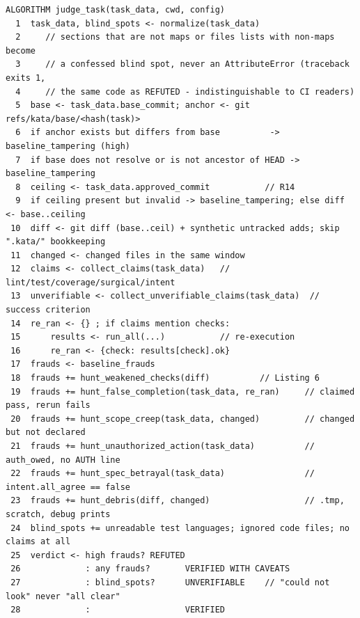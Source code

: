 \documentclass[11pt]{article}
\begin{document}
\begin{lstlisting}[caption=adversarial judge (kata/judge.py).,label=alg:judge]
ALGORITHM judge_task(task_data, cwd, config)
  1  task_data, blind_spots <- normalize(task_data)
  2     // sections that are not maps or files lists with non-maps become
  3     // a confessed blind spot, never an AttributeError (traceback exits 1,
  4     // the same code as REFUTED - indistinguishable to CI readers)
  5  base <- task_data.base_commit; anchor <- git refs/kata/base/<hash(task)>
  6  if anchor exists but differs from base          -> baseline_tampering (high)
  7  if base does not resolve or is not ancestor of HEAD -> baseline_tampering
  8  ceiling <- task_data.approved_commit           // R14
  9  if ceiling present but invalid -> baseline_tampering; else diff <- base..ceiling
 10  diff <- git diff (base..ceil) + synthetic untracked adds; skip ".kata/" bookkeeping
 11  changed <- changed files in the same window
 12  claims <- collect_claims(task_data)   // lint/test/coverage/surgical/intent
 13  unverifiable <- collect_unverifiable_claims(task_data)  // success criterion
 14  re_ran <- {} ; if claims mention checks:
 15      results <- run_all(...)           // re-execution
 16      re_ran <- {check: results[check].ok}
 17  frauds <- baseline_frauds
 18  frauds += hunt_weakened_checks(diff)          // Listing 6
 19  frauds += hunt_false_completion(task_data, re_ran)     // claimed pass, rerun fails
 20  frauds += hunt_scope_creep(task_data, changed)         // changed but not declared
 21  frauds += hunt_unauthorized_action(task_data)          // auth_owed, no AUTH line
 22  frauds += hunt_spec_betrayal(task_data)                // intent.all_agree == false
 23  frauds += hunt_debris(diff, changed)                   // .tmp, scratch, debug prints
 24  blind_spots += unreadable test languages; ignored code files; no claims at all
 25  verdict <- high frauds? REFUTED
 26             : any frauds?       VERIFIED WITH CAVEATS
 27             : blind_spots?      UNVERIFIABLE    // "could not look" never "all clear"
 28             :                   VERIFIED
\end{lstlisting}
\end{document}
